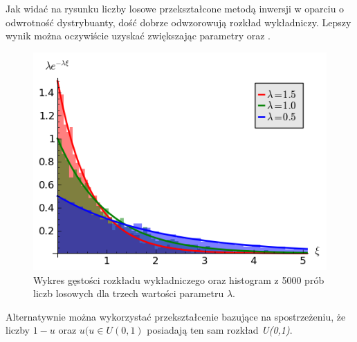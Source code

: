 \documentclass[a4paper,12pt,polish]{sphinxmanual}
\begin{document}
Jak widać na rysunku liczby losowe przekształcone metodą inwersji w oparciu o odwrotność dystrybuanty, dość dobrze
odwzorowują rozkład wykładniczy. Lepszy wynik można oczywiście uzyskać zwiększając parametry  oraz .
\begin{figure}[htbp]
\centering
\capstart

\includegraphics{r_exp_hist.png}
\caption{Wykres gęstości rozkładu wykładniczego oraz histogram z 5000 prób liczb losowych dla trzech wartości parametru
$\lambda$.}\end{figure}

Alternatywnie można wykorzystać przekształcenie bazujące na spostrzeżeniu, że liczby $1-u$ oraz
$u (u \in U(0,1)$ posiadają ten sam rozkład \emph{U(0,1)}.
\end{document}
